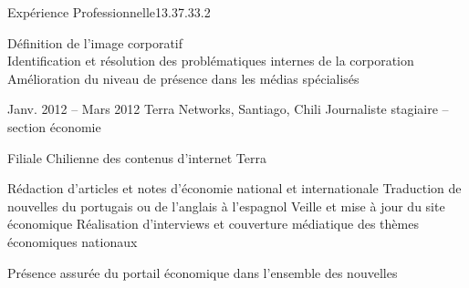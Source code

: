 \documentclass[30pt, french]{tccv}
\begin{document}
\begin{upshape}
\begin{flat_frame}{Expérience Professionnelle}{13.3}{7.3}{3.2}{}
\begin{eventlist}
  Définition de l’image corporatif \\
\mission{}            Identification et résolution des problématiques internes de la corporation \\
\mission{} 	      Amélioration du niveau de présence dans les médias spécialisés \\


  
\setlength{\parskip}{0pt}
\item{Janv. 2012 -- Mars 2012 }     
  {Terra Networks, Santiago, Chili}     
  {Journaliste stagiaire – section économie}
  \fontsize{9pt}{1em}\color{text}\bodyfontlight\upshape\selectfont

 Filiale Chilienne des contenus d’internet Terra  \\
  
\setlength{\parskip}{-10pt}
\begin{itemize}
      \setlength\itemsep{-3pt} 
      \cvitem[\checkmark] Rédaction d'articles et notes d’économie national et internationale
      \cvitem[\checkmark] Traduction de nouvelles du portugais ou de l'anglais à l'espagnol
      \cvitem[\checkmark] Veille et mise à jour du site économique
      \cvitem[\checkmark] Réalisation d'interviews et couverture médiatique des thèmes économiques nationaux
\end{itemize}        

 Présence assurée du portail économique dans l’ensemble des nouvelles \\
\mission{}           

   

\end{eventlist}
\end{flat_frame}







\end{upshape}
\end{document}
